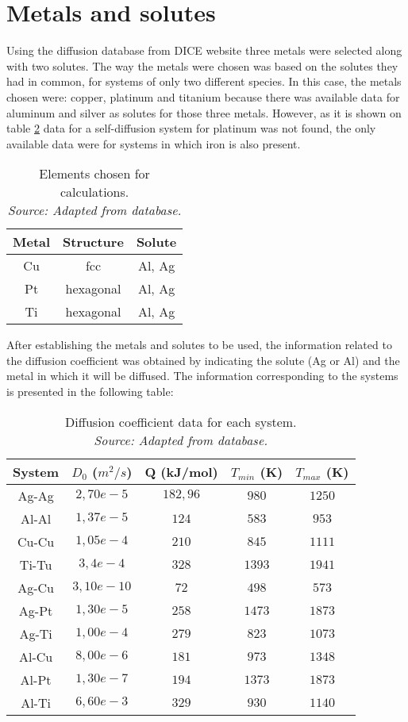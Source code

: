 \section{Metals and solutes}

Using the diffusion database from DICE website three metals were selected along with two solutes. The way the metals were chosen was based on the solutes they had in common, for systems of only two different species. In this case, the metals chosen were: copper, platinum and titanium because there was available data for aluminum and silver as solutes for those three metals. However, as it is shown on table \ref{tab:tabla2} data for a self-diffusion system for platinum was not found, the only available data were for systems in which iron is also present. 

\begin{table}[h]
    \centering
    \begin{tabular}{ccc}
        Metal & Structure & Solute\\ \hline \hline
        Cu & fcc & Al, Ag \\
        Pt & hexagonal & Al, Ag \\
        Ti & hexagonal & Al, Ag \\
    \end{tabular}
    \caption{Elements chosen for calculations. \\ 
    \textit{Source: Adapted from \citep{kakusan} database.}}
    \label{tab:tabla1}
\end{table}

After establishing the metals and solutes to be used, the information related to the diffusion coefficient was obtained by indicating the solute (Ag or Al) and the metal in which it will be diffused. The information corresponding to the systems is presented in the following table:

\begin{table}[h]
    \centering
    \begin{tabular}{ccccc}
        System & $D_0$ ($m^2/s$) & Q (kJ/mol) & $T_{min}$ (K) & $T_{max}$ (K) \\ \hline \hline
        Ag-Ag & $2,70e-5$ & $182,96$ & $980$ & $1250$\\
        Al-Al & $1,37e-5$ & $124$ & $583$ & $953$ \\
        Cu-Cu & $1,05e-4$ & $210$ & $845$ & $1111$\\
        Ti-Tu & $3,4e-4$ & $328$ & $1393$ & $1941$ \\
        Ag-Cu & $3,10e-10$ & $72$ & $498$ & $573$\\
        Ag-Pt & $1,30e-5$ & $258$ & $1473$ & $1873$\\
        Ag-Ti & $1,00e-4$ & $279$ & $823$ & $1073$ \\
        Al-Cu & $8,00e-6$ & $181$ & $973$ & $1348$ \\
        Al-Pt & $1,30e-7$ & $194$ & $1373$ & $1873$\\
        Al-Ti & $6,60e-3$ & $329$ & $930$ & $1140$
    \end{tabular}
    \caption{Diffusion coefficient data for each system. \\
    \textit{Source: Adapted from \citep{kakusan} database.}}
    \label{tab:tabla2}
\end{table}